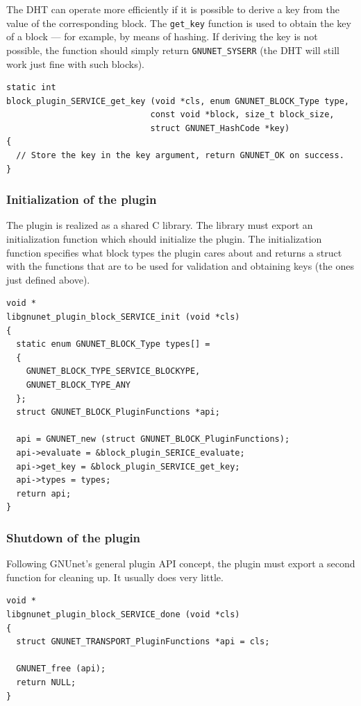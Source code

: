 \documentclass[10pt]{article}
\begin{document}
The DHT can operate more efficiently if it is possible to derive a key
from the value of the corresponding block.  The {\tt get\_key}
function is used to obtain the key of a block --- for example, by
means of hashing.  If deriving the key is not possible, the function
should simply return {\tt GNUNET\_SYSERR} (the DHT will still work
just fine with such blocks).

\lstset{language=C}
\begin{lstlisting}
static int
block_plugin_SERVICE_get_key (void *cls, enum GNUNET_BLOCK_Type type,
                             const void *block, size_t block_size,
                             struct GNUNET_HashCode *key)
{
  // Store the key in the key argument, return GNUNET_OK on success.
}
\end{lstlisting}

\subsubsection{Initialization of the plugin}

The plugin is realized as a shared C library.  The library must export
an initialization function which should initialize the plugin.  The
initialization function specifies what block types the plugin cares
about and returns a struct with the functions that are to be used for
validation and obtaining keys (the ones just defined above).

\lstset{language=C}
\begin{lstlisting}
void *
libgnunet_plugin_block_SERVICE_init (void *cls)
{
  static enum GNUNET_BLOCK_Type types[] =
  {
    GNUNET_BLOCK_TYPE_SERVICE_BLOCKYPE,
    GNUNET_BLOCK_TYPE_ANY
  };
  struct GNUNET_BLOCK_PluginFunctions *api;

  api = GNUNET_new (struct GNUNET_BLOCK_PluginFunctions);
  api->evaluate = &block_plugin_SERICE_evaluate;
  api->get_key = &block_plugin_SERVICE_get_key;
  api->types = types;
  return api;
}
\end{lstlisting}

\subsubsection{Shutdown of the plugin}

Following GNUnet's general plugin API concept, the plugin must
export a second function for cleaning up.  It usually does very
little.

\lstset{language=C}
\begin{lstlisting}
void *
libgnunet_plugin_block_SERVICE_done (void *cls)
{
  struct GNUNET_TRANSPORT_PluginFunctions *api = cls;

  GNUNET_free (api);
  return NULL;
}
\end{lstlisting}
\end{document}
